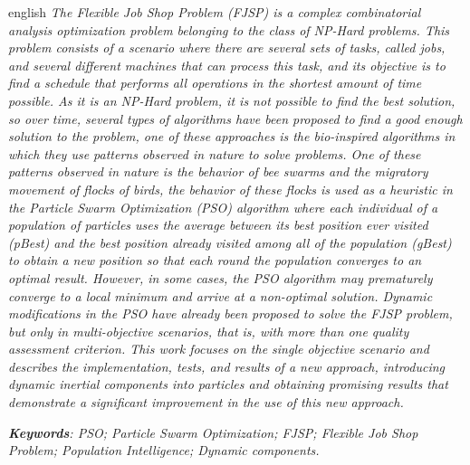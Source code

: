 \par

\begin{resumo}[Abstract]
  \begin{otherlanguage*}{english}
    \emph{
      The \textit{Flexible Job Shop Problem} (FJSP) is a complex combinatorial analysis optimization problem belonging to the class of NP-Hard problems. This problem consists of a scenario where there are several sets of tasks, called \textit{jobs}, and several different machines that can process this task, and its objective is to find a schedule that performs all operations in the shortest amount of time possible. As it is an NP-Hard problem, it is not possible to find the best solution, so over time, several types of algorithms have been proposed to find a good enough solution to the problem, one of these approaches is the bio-inspired algorithms in which they use patterns observed in nature to solve problems. One of these patterns observed in nature is the behavior of bee swarms and the migratory movement of flocks of birds, the behavior of these flocks is used as a heuristic in the \textit{Particle Swarm Optimization} (PSO) algorithm where each individual of a population of particles uses the average between its best position ever visited (\textit{pBest}) and the best position already visited among all of the population (\textit{gBest}) to obtain a new position so that each round the population converges to an optimal result. However, in some cases, the PSO algorithm may prematurely converge to a local minimum and arrive at a non-optimal solution. Dynamic modifications in the PSO have already been proposed to solve the FJSP problem, but only in multi-objective scenarios, that is, with more than one quality assessment criterion. This work focuses on the single objective scenario and describes the implementation, tests, and results of a new approach, introducing dynamic inertial components into particles and obtaining promising results that demonstrate a significant improvement in the use of this new approach.
    }
    \vspace{\onelineskip}

    \noindent
    \emph{	
      \textbf{Keywords}: PSO; Particle Swarm Optimization; FJSP; Flexible Job Shop Problem; Population Intelligence; Dynamic components.
    }
  \end{otherlanguage*}
\end{resumo}
